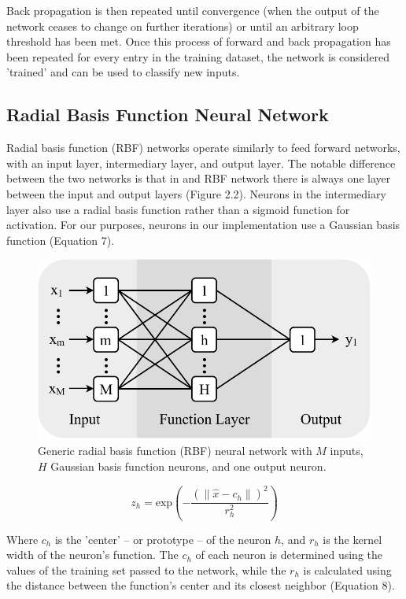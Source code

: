 Back propagation is then repeated until convergence (when the output of the network ceases to change on further iterations) or until an arbitrary loop threshold has been met. Once this process of forward and back propagation has been repeated for every entry in the training dataset, the network is considered 'trained' and can be used to classify new inputs.

\subsection{Radial Basis Function Neural Network}

Radial basis function (RBF) networks operate similarly to feed forward networks, with an input layer, intermediary layer, and output layer. The notable difference between the two networks is that in and RBF network there is always one layer between the input and output layers (Figure 2.2)\citep{Fernandez2012}. Neurons in the intermediary layer also use a radial basis function rather than a sigmoid function for activation. For our purposes, neurons in our implementation use a Gaussian basis function (Equation 7).

\begin{figure}[t!]
	\centering
	\includegraphics[width=0.7\linewidth]{images/radial_basis_function_diagram.pdf}
	\caption{Generic radial basis function (RBF) neural network with $M$ inputs, $H$ Gaussian basis function neurons, and one output neuron.}
\end{figure}

\begin{equation}
z_h = \text{exp}{\left(-\frac{(\|\hat{x} - c_h\|)^2}{r^2_h}\right)}
\end{equation}

Where $c_h$ is the 'center' -- or prototype -- of the neuron $h$, and $r_h$ is the kernel width of the neuron's function. The $c_h$ of each neuron is determined using the values of the training set passed to the network, while the $r_h$ is calculated using the distance between the function's center and its closest neighbor (Equation 8)\citep{Nabil2003}.

